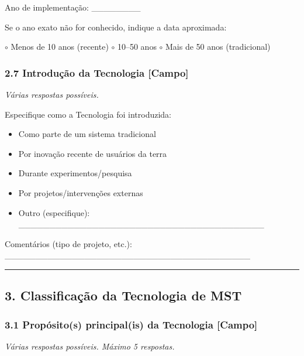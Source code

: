 Ano de implementação: \_\_\_\_\_\_\_\_

Se o ano exato não for conhecido, indique a data aproximada:

$\circ$ Menos de 10 anos (recente) $\circ$ 10--50 anos $\circ$ Mais de 50 anos (tradicional)

\subsubsection{2.7 Introdução da Tecnologia {[Campo]}}\label{introduuxe7uxe3o-da-tecnologia}

\emph{Várias respostas possíveis.}

Especifique como a Tecnologia foi introduzida:

\begin{itemize}
\tightlist
\item[$\square$]
  Como parte de um sistema tradicional
\item[$\square$]
  Por inovação recente de usuários da terra
\item[$\square$]
  Durante experimentos/pesquisa
\item[$\square$]
  Por projetos/intervenções externas
\item[$\square$]
  Outro (especifique): \_\_\_\_\_\_\_\_\_\_\_\_\_\_\_\_\_\_\_\_\_\_\_\_\_\_\_\_\_\_\_\_\_\_\_\_\_\_\_\_
\end{itemize}

Comentários (tipo de projeto, etc.): \_\_\_\_\_\_\_\_\_\_\_\_\_\_\_\_\_\_\_\_\_\_\_\_\_\_\_\_\_\_\_\_\_\_\_\_\_\_\_\_

\newpage

\begin{center}\rule{0.5\linewidth}{0.5pt}\end{center}

\subsection{3. Classificação da Tecnologia de MST}\label{classificauxe7uxe3o-da-tecnologia-de-mst}

\subsubsection{3.1 Propósito(s) principal(is) da Tecnologia {[Campo]}}\label{propuxf3sitos-principalis-da-tecnologia}

\emph{Várias respostas possíveis. Máximo 5 respostas.}

